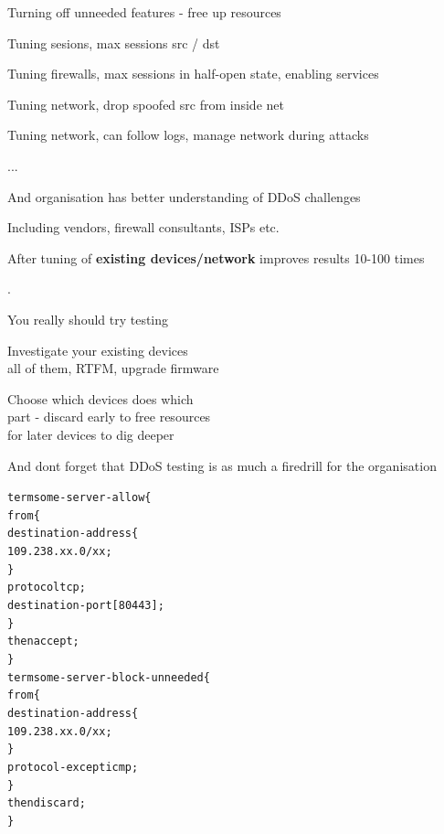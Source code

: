 \documentclass[Screen16to9,17pt]{foils}
\begin{document}

\begin{list1}
\item Turning off unneeded features - free up resources
\item Tuning sesions, max sessions src / dst
\item Tuning firewalls, max sessions in half-open state, enabling services
\item Tuning network, drop spoofed src from inside net \smiley
\item Tuning network, can follow logs, manage network during attacks
\item ...
\item And organisation has better understanding of DDoS challenges
\item Including vendors, firewall consultants, ISPs etc.
\end{list1}

\vskip 1cm
\centerline{After tuning of {\bf existing devices/network} improves results 10-100 times}


.
\begin{list1}
\item You really should try testing
\item Investigate your existing devices\\
all of them, RTFM, upgrade firmware
\item Choose which devices does which\\
part - discard early to free resources\\
for later devices to dig deeper
\end{list1}

\vskip 2cm
\centerline{And dont forget that DDoS testing is as much a firedrill for the organisation}



\begin{alltt}\footnotesize
term some-server-allow \{
    from \{
        destination-address \{
            109.238.xx.0/xx;
        \}
        protocol tcp;
        destination-port [ 80 443 ];
    \}
    then accept;
\}
term some-server-block-unneeded \{
    from \{
        destination-address \{
            109.238.xx.0/xx;
        \}
        protocol-except icmp;
    \}
    then discard;
\}
\end{alltt}



\slidenext{}
\end{document}

